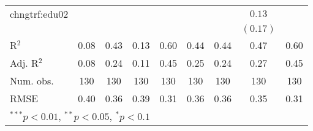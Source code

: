 \begin{table}
\begin{center}
\begin{tabular}{l c c c c c c c c }
chngtrf:edu02   &              &          &              &               &          &          & $0.13$   &              \\
                &              &          &              &               &          &          & $(0.17)$ &              \\
\hline
R$^2$           & 0.08         & 0.43     & 0.13         & 0.60          & 0.44     & 0.44     & 0.47     & 0.60         \\
Adj. R$^2$      & 0.08         & 0.24     & 0.11         & 0.45          & 0.25     & 0.24     & 0.27     & 0.45         \\
Num. obs.       & 130          & 130      & 130          & 130           & 130      & 130      & 130      & 130          \\
RMSE            & 0.40         & 0.36     & 0.39         & 0.31          & 0.36     & 0.36     & 0.35     & 0.31         \\
\hline
\multicolumn{9}{l}{\scriptsize{$^{***}p<0.01$, $^{**}p<0.05$, $^*p<0.1$}}
\end{tabular}
\label{table:coefficients}
\end{center}
\end{table}
